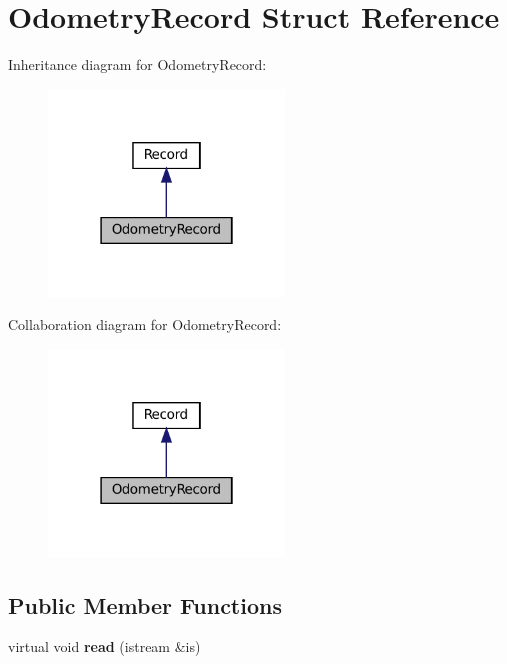 \hypertarget{structOdometryRecord}{}\section{Odometry\+Record Struct Reference}
\label{structOdometryRecord}


Inheritance diagram for Odometry\+Record\+:
\nopagebreak
\begin{figure}[H]
\begin{center}
\leavevmode
\includegraphics[width=178pt]{structOdometryRecord__inherit__graph}
\end{center}
\end{figure}


Collaboration diagram for Odometry\+Record\+:
\nopagebreak
\begin{figure}[H]
\begin{center}
\leavevmode
\includegraphics[width=178pt]{structOdometryRecord__coll__graph}
\end{center}
\end{figure}
\subsection*{Public Member Functions}
\begin{DoxyCompactItemize}
\item 
\mbox{\label{structOdometryRecord_a789ffe6acfa2a268b24858f3aea3a3d8}} 
virtual void {\bfseries read} (istream \&is)
\end{DoxyCompactItemize}
